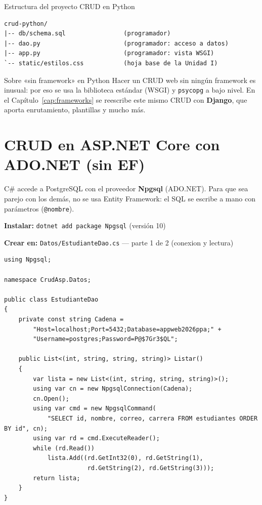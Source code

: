\begin{cajaejemplo}{Estructura del proyecto CRUD en Python}
\begin{lstlisting}[style=shell,caption={Estructura del CRUD Python},label={lst:c6-py-tree}]
crud-python/
|-- db/schema.sql                (programador)
|-- dao.py                       (programador: acceso a datos)
|-- app.py                       (programador: vista WSGI)
`-- static/estilos.css           (hoja base de la Unidad I)
\end{lstlisting}
\end{cajaejemplo}

\begin{cajaadvertencia}{Sobre «sin framework» en Python}
Hacer un CRUD web sin ningún framework es inusual: por eso se usa la
biblioteca estándar (WSGI) y \texttt{psycopg} a bajo nivel. En el
Capítulo~\ref{cap:frameworks} se reescribe este mismo CRUD con
\textbf{Django}, que aporta enrutamiento, plantillas y mucho más.
\end{cajaadvertencia}

\section{CRUD en ASP.NET Core con ADO.NET (sin EF)}
\label{sec:cap6:asp}

C\# accede a PostgreSQL con el proveedor \textbf{Npgsql} (ADO.NET). Para
que sea parejo con los demás, no se usa Entity Framework: el SQL se
escribe a mano con parámetros (\texttt{@nombre}).

{\small\textbf{Instalar:} \texttt{dotnet add package Npgsql} (versión 10)}

{\small\textbf{Crear en:} \texttt{Datos/EstudianteDao.cs} --- parte 1 de 2 (conexion y lectura)}
\begin{lstlisting}[style=cs,caption={EstudianteDao.cs --- parte 1: conexion y listar},label={lst:c6-asp-a}]
using Npgsql;

namespace CrudAsp.Datos;

public class EstudianteDao
{
    private const string Cadena =
        "Host=localhost;Port=5432;Database=appweb2026ppa;" +
        "Username=postgres;Password=P@$7Gr3$QL";

    public List<(int, string, string, string)> Listar()
    {
        var lista = new List<(int, string, string, string)>();
        using var cn = new NpgsqlConnection(Cadena);
        cn.Open();
        using var cmd = new NpgsqlCommand(
            "SELECT id, nombre, correo, carrera FROM estudiantes ORDER BY id", cn);
        using var rd = cmd.ExecuteReader();
        while (rd.Read())
            lista.Add((rd.GetInt32(0), rd.GetString(1),
                       rd.GetString(2), rd.GetString(3)));
        return lista;
    }
}
\end{lstlisting}

